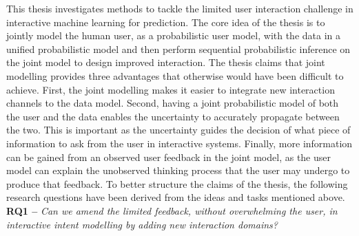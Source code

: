 \documentclass[dissertation,math,vertlayout,pdfa,colorlinks]{aaltoseries}
\begin{document}
This thesis investigates methods to tackle the limited user interaction challenge in interactive machine learning for prediction. The core idea of the thesis is to jointly model the human user, as a probabilistic user model, with the data in a unified probabilistic model and then perform sequential probabilistic inference on the joint model to design improved interaction. The thesis claims that joint modelling provides three advantages that otherwise would have been difficult to achieve. First, the joint modelling makes it easier to integrate new interaction channels to the data model. Second, having a joint probabilistic model of both the user and the data enables the uncertainty to accurately propagate between the two. This is important as the uncertainty guides the decision of what piece of information to ask from the user in interactive systems. Finally, more information can be gained from an observed user feedback in the joint model, as the user model can explain the unobserved thinking process that the user may undergo to produce that feedback. To better structure the claims of the thesis, the following research questions have been derived from the ideas and tasks mentioned above.\\



\noindent \textbf{RQ1 --} \textit{Can we amend the limited feedback, without overwhelming the user, in interactive intent modelling by adding new interaction domains?}
\end{document}
